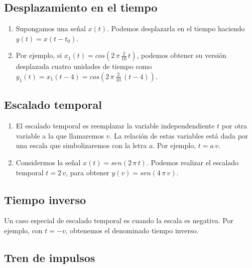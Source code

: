 \subsection{Desplazamiento en el tiempo}

\begin{enumerate}
\item Supongamos una se\~{n}al $x(t)$. Podemos desplazarla en el tiempo
haciendo $y(t) = x(t - t_{0})$.

\item Por ejemplo, si $x_{1}(t) = cos(2 \, \pi \, \frac{2}{10} \, t)$,
  podemos obtener su versi\'{o}n desplazada cuatro unidades de tiempo como
  $y_{1}(t) = x_{1}(t - 4) =  cos(2 \, \pi \, \frac{2}{10} \, (t - 4))$.
\end{enumerate}


\subsection{Escalado temporal}

\begin{enumerate}
\item El escalado temporal es reemplazar la variable independendiente $t$
por otra variable a la que llamaremos $v$. La relaci\'{o}n de estas
variables est\'{a} dada por una escala que simbolizaremos con la letra
$a$. Por ejemplo, $t = a \, v$.

\item Considermos la se\~{n}al $x(t) = sen(2 \, \pi \, t)$. Podemos
  realizar el escalado temporal $t = 2  \, v$, para obtener $y(v) =
  sen(4 \, \pi \, v)$.

\end{enumerate}

\subsection{Tiempo inverso}

Un caso especial de escalado temporal es cuando la escala es
negativa. Por ejemplo, con $t = - v$, obtenemos el denominado tiempo inverso.

\subsection{Tren de impulsos}

